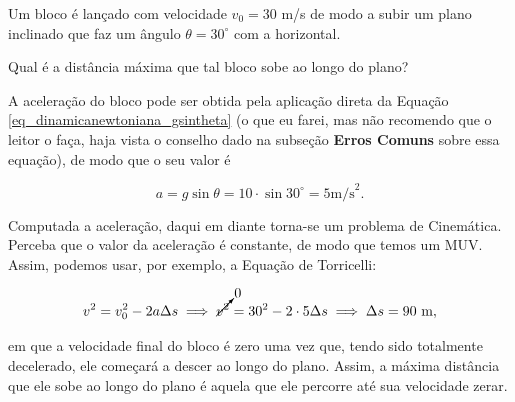 \begin{exemplo}[Nível I]\label{exemplo_dinamica1_planoinclinado01}

Um bloco é lançado com velocidade $v_0=30$ m/s de modo a subir um plano inclinado que faz um ângulo $\theta = 30^\circ$ com a horizontal.

Qual é a distância máxima que tal bloco sobe ao longo do plano?

\resolucao

A aceleração do bloco pode ser obtida pela aplicação direta da Equação \eqref{eq_dinamicanewtoniana_gsintheta} (o que eu farei, mas não recomendo que o leitor o faça, haja vista o conselho dado na subseção \textbf{Erros Comuns} sobre essa equação), de modo que o seu valor é

$$ a = g \sin \theta = 10 \cdot \sin 30^\circ = 5 \text{m/s}^2.$$

Computada a aceleração, daqui em diante torna-se um problema de Cinemática. Perceba que o valor da aceleração é constante, de modo que temos um MUV. Assim, podemos usar, por exemplo, a Equação de Torricelli:


$$ v^2 = v_0^2-2a\Delta s \implies \cancelto{0}{v^2} = 30^2 - 2 \cdot 5\Delta s \implies \Delta s = 90 \text{ m},$$

\noindent em que a velocidade final do bloco é zero uma vez que, tendo sido totalmente decelerado, ele começará a descer ao longo do plano. Assim, a máxima distância que ele sobe ao longo do plano é aquela que ele percorre até sua velocidade zerar.


\end{exemplo}


\vspace{0.3cm}


